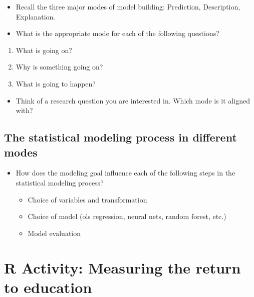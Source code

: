 \documentclass[
]{book}
\providecommand{\tightlist}{%
  \setlength{\itemsep}{0pt}\setlength{\parskip}{0pt}}
\theoremstyle{definition}
\theoremstyle{definition}
\theoremstyle{definition}
\theoremstyle{definition}
\theoremstyle{remark}
\begin{document}
\begin{itemize}
\tightlist
\item
  Recall the three major modes of model building: Prediction, Description, Explanation.
\item
  What is the appropriate mode for each of the following questions?
\end{itemize}

\begin{enumerate}
\def\labelenumi{\arabic{enumi}.}
\tightlist
\item
  What is going on?
\item
  Why is something going on?
\item
  What is going to happen?
\end{enumerate}

\begin{itemize}
\tightlist
\item
  Think of a research question you are interested in. Which mode is it aligned with?
\end{itemize}

\subsection{The statistical modeling process in different modes}\label{the-statistical-modeling-process-in-different-modes}

\begin{itemize}
\item
  How does the modeling goal influence each of the following steps in the statistical modeling process?

  \begin{itemize}
  \item
    Choice of variables and transformation
  \item
    Choice of model (ols regression, neural nets, random forest, etc.)
  \item
    Model evaluation
  \end{itemize}
\end{itemize}

\section{R Activity: Measuring the return to education}\label{r-activity-measuring-the-return-to-education}
\end{document}
